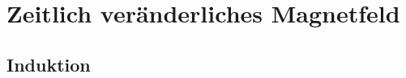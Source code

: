 %
%
%
%
%
\newpage
\section{Zeitlich veränderliches Magnetfeld}
\subsection{Induktion}

\beginip
\iend

